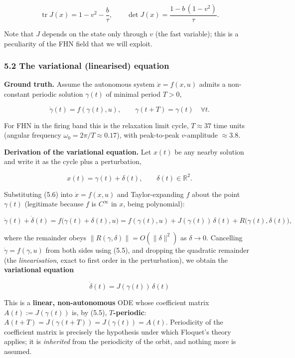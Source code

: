 \documentclass[
  11pt,
]{article}
\providecommand{\gt}{>}
\begin{document}
\[
\operatorname{tr}J(x)=1-v^2-\frac{b}{\tau},
\qquad
\det J(x)=\frac{1-b\,(1-v^2)}{\tau}.
\tag{5.4}
\]

Note that \(J\) depends on the state only through \(v\) (the fast
variable); this is a peculiarity of the FHN field that we will exploit.

\subsubsection{5.2 The variational (linearised)
equation}\label{the-variational-linearised-equation}

\textbf{Ground truth.} Assume the autonomous system \(\dot x=f(x,u)\)
admits a non-constant periodic solution \(\gamma(t)\) of minimal period
\(T\gt 0\),

\[
\dot\gamma(t)=f(\gamma(t),u),\qquad \gamma(t+T)=\gamma(t)\quad\forall t .
\tag{5.5}
\]

For FHN in the firing band this is the relaxation limit cycle,
\(T\approx 37\) time units (angular frequency
\(\omega_0=2\pi/T\approx 0.17\)), with peak-to-peak \(v\)-amplitude
\(\approx3.8\).

\textbf{Derivation of the variational equation.} Let \(x(t)\) be any
nearby solution and write it as the cycle plus a perturbation,

\[
x(t)=\gamma(t)+\delta(t),\qquad \delta(t)\in\mathbb{R}^2 .
\tag{5.6}
\]

Substituting (5.6) into \(\dot x=f(x,u)\) and Taylor-expanding \(f\)
about the point \(\gamma(t)\) (legitimate because \(f\) is \(C^\infty\)
in \(x\), being polynomial):

\[
\dot\gamma(t)+\dot\delta(t)
= f\big(\gamma(t)+\delta(t),u\big)
= f(\gamma(t),u)+J(\gamma(t))\,\delta(t)+R\big(\gamma(t),\delta(t)\big),
\tag{5.7}
\]

where the remainder obeys \(\|R(\gamma,\delta)\|=O(\|\delta\|^2)\) as
\(\delta\to0\). Cancelling \(\dot\gamma=f(\gamma,u)\) from both sides
using (5.5), and dropping the quadratic remainder (the
\emph{linearisation}, exact to first order in the perturbation), we
obtain the \textbf{variational equation}

\[
\boxed{\;\dot\delta(t)=J(\gamma(t))\,\delta(t)\;}
\tag{5.8}
\]

This is a \textbf{linear, non-autonomous} ODE whose coefficient matrix
\(A(t):=J(\gamma(t))\) is, by (5.5), \textbf{\(T\)-periodic}:
\(A(t+T)=J(\gamma(t+T))=J(\gamma(t))=A(t)\). Periodicity of the
coefficient matrix is precisely the hypothesis under which Floquet's
theory applies; it is \emph{inherited} from the periodicity of the
orbit, and nothing more is assumed.
\end{document}
